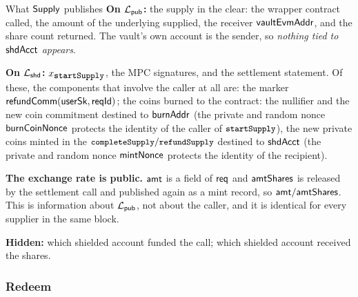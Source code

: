 \begin{PubBox}{What $\mathsf{Supply}$ publishes}
\textbf{On $\mathcal{L}_{\mathsf{pub}}$:} the supply in the clear: the wrapper contract called, the amount of the
underlying supplied, the receiver $\mathsf{vaultEvmAddr}$, and the share count returned. The vault's own account is the sender, so \emph{nothing tied to $\mathsf{shdAcct}$ appears}.

\smallskip
\textbf{On $\mathcal{L}_{\mathsf{shd}}$:} $x_{\texttt{\small startSupply}}$, the MPC signatures, and the settlement statement.
Of these, the components that involve the caller at all are: the marker
$\mathsf{refundComm}(\mathsf{userSk}, \mathsf{reqId})$; the coins burned to the contract: the nullifier and the new coin commitment destined to $\mathsf{burnAddr}$ (the private and random nonce $\mathsf{burnCoinNonce}$ protects the identity of the caller of $\texttt{\small startSupply}$), the new private coins minted in the $\texttt{\small completeSupply}/\texttt{\small refundSupply}$ destined  to $\mathsf{shdAcct}$ (the private and random nonce $\mathsf{mintNonce}$ protects the identity of the recipient).

\smallskip
\textbf{The exchange rate is public.} $\mathsf{amt}$ is a field of $\mathsf{req}$ and $\mathsf{amtShares}$ is
released by the settlement call and published again as a mint record, so
$\mathsf{amt} / \mathsf{amtShares}$. This is
information about $\mathcal{L}_{\mathsf{pub}}$, not about the caller, and it is identical for every supplier in the same
block.

\smallskip
\textbf{Hidden:} which shielded account funded the call; which shielded account received the shares.\end{PubBox}


\subsubsection{Redeem}

